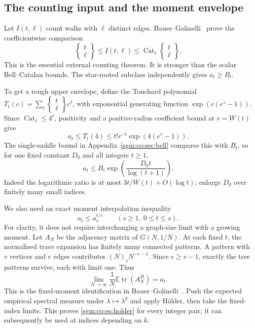 \documentclass[11pt,letterpaper]{article}
\theoremstyle{remark}\newtheorem{remark}[theorem]{Remark}
\newcommand{\Cat}{\operatorname{Cat}}\newcommand{\E}{\mathbb E}\newcommand{\Prob}{\mathbb P}\newcommand{\ind}{\mathbf 1}
\newcommand{\Stir}[2]{\left\{\begin{matrix}#1\\#2\end{matrix}\right\}}
\theoremstyle{definition}\newtheorem{definition}[theorem]{Definition}
\begin{document}
\subsection{The counting input and the moment envelope}
Let $I(t,\ell)$ count walks with $\ell$ distinct edges. Bauer--Golinelli~\cite[Section 5.5, equation (9)]{bg} prove the coefficientwise comparison
\begin{equation}\label{sgm:co:eq:BG}
 \Stir t\ell\le I(t,\ell)\le\Cat_\ell\Stir t\ell.
\end{equation}
This is the essential external counting theorem. It is stronger than the scalar Bell--Catalan bounds. The star-rooted subclass independently gives $a_t\ge B_t$.

To get a rough upper envelope, define the Touchard polynomial
$T_t(c)=\sum_\ell\Stir t\ell c^\ell$, with exponential generating function
$\exp(c(e^z-1))$. Since $\Cat_\ell\le4^\ell$, positivity and a positive-radius coefficient bound at $r=W(t)$ give
\[
 a_t\le T_t(4)\le t!r^{-t}\exp(4(e^r-1)).
\]
The single-saddle bound in Appendix~\ref{sgm:co:sec:bell} compares this with $B_t$, so for one fixed constant $D_0$ and all integers $t\ge1$,
\begin{equation}\label{sgm:co:eq:envelope}
 a_t\le B_t\exp\left(\frac{D_0t}{\log(t+1)}\right).
\end{equation}
Indeed the logarithmic ratio is at most $3t/W(t)+O(\log t)$; enlarge $D_0$ over finitely many small indices.

We also need an exact moment interpolation inequality
\begin{equation}\label{sgm:co:eq:holder}
 a_t\le a_s^{t/s}\qquad(s\ge1,\ 0\le t\le s).
\end{equation}
For clarity, it does not require interchanging a graph-size limit with a growing moment. Let $A_N$ be the adjacency matrix of $G(N,1/N)$. At each fixed $t$, the normalized trace expansion has finitely many connected patterns. A pattern with $v$ vertices and $e$ edges contributes $(N)_vN^{-e-1}$. Since $e\ge v-1$, exactly the tree patterns survive, each with limit one. Thus
\[
 \lim_{N\to\infty}\frac1N\E\operatorname{tr}(A_N^{2t})=a_t.
\]
This is the fixed-moment identification in Bauer--Golinelli~\cite[Section 5.3]{bg}. Push the expected empirical spectral measure under $\lambda\mapsto\lambda^2$ and apply H\"older, then take the fixed-index limits. This proves \eqref{sgm:co:eq:holder} for every integer pair; it can subsequently be used at indices depending on $k$.
\end{document}
